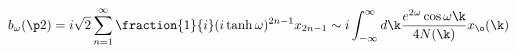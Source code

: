 \begin{equation} b_\omega(\p2)=i\sqrt{2}\sum_{n=1}^\infty
\fraction{1}{i}(i\tanh\omega)^{2n-1}x_{2n-1}\sim i
\int_{-\infty}^\infty d\k
\frac{e^{2\omega}\cos\omega\k}{4N(\k)}x_\o(\k)
\end{equation} 
